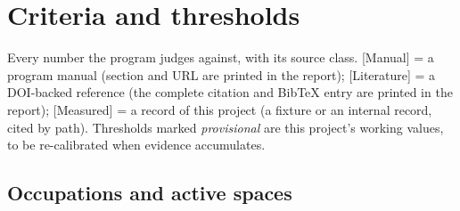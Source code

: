 \chapter{Criteria and thresholds}
\label{ch:criteria}

Every number the program judges against, with its source class. \textsf{[Manual]}
= a program manual (section and URL are printed in the report);
\textsf{[Literature]} = a DOI-backed reference (the complete citation and
BibTeX entry are printed in the report); \textsf{[Measured]} = a record of this
project (a fixture or an internal record, cited by path). Thresholds marked
\emph{provisional} are this project's working values, to be re-calibrated when
evidence accumulates.

\section{Occupations and active spaces}

